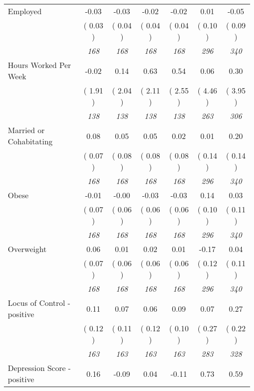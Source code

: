 \begin{tabular}{l c c c c c c}
Employed &     -0.03 &     -0.03 &     -0.02 &     -0.02 &      0.01 &     -0.05 \\
& (     0.03 ) & (     0.04 ) & (     0.04 ) & (     0.04 ) & (     0.10 ) & (     0.09 ) \\
& \textit{ 168 } & \textit{ 168 } & \textit{ 168 } & \textit{ 168 } & \textit{ 296 } & \textit{ 340 } \\
Hours Worked Per Week &     -0.02 &      0.14 &      0.63 &      0.54 &      0.06 &      0.30 \\
& (     1.91 ) & (     2.04 ) & (     2.11 ) & (     2.55 ) & (     4.46 ) & (     3.95 ) \\
& \textit{ 138 } & \textit{ 138 } & \textit{ 138 } & \textit{ 138 } & \textit{ 263 } & \textit{ 306 } \\
Married or Cohabitating &      0.08 &      0.05 &      0.05 &      0.02 &      0.01 &      0.20 \\
& (     0.07 ) & (     0.08 ) & (     0.08 ) & (     0.08 ) & (     0.14 ) & (     0.14 ) \\
& \textit{ 168 } & \textit{ 168 } & \textit{ 168 } & \textit{ 168 } & \textit{ 296 } & \textit{ 340 } \\
Obese &     -0.01 &     -0.00 &     -0.03 &     -0.03 &      0.14 &      0.03 \\
& (     0.07 ) & (     0.06 ) & (     0.06 ) & (     0.06 ) & (     0.10 ) & (     0.11 ) \\
& \textit{ 168 } & \textit{ 168 } & \textit{ 168 } & \textit{ 168 } & \textit{ 296 } & \textit{ 340 } \\
Overweight &      0.06 &      0.01 &      0.02 &      0.01 &     -0.17 &      0.04 \\
& (     0.07 ) & (     0.06 ) & (     0.06 ) & (     0.06 ) & (     0.12 ) & (     0.11 ) \\
& \textit{ 168 } & \textit{ 168 } & \textit{ 168 } & \textit{ 168 } & \textit{ 296 } & \textit{ 340 } \\
Locus of Control - positive &      0.11 &      0.07 &      0.06 &      0.09 &      0.07 &      0.27 \\
& (     0.12 ) & (     0.11 ) & (     0.12 ) & (     0.10 ) & (     0.27 ) & (     0.22 ) \\
& \textit{ 163 } & \textit{ 163 } & \textit{ 163 } & \textit{ 163 } & \textit{ 283 } & \textit{ 328 } \\
Depression Score - positive &      0.16 &     -0.09 &      0.04 &     -0.11 &      0.73 &      0.59 \\

\end{tabular}
